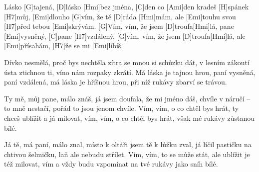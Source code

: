 
\sloka
[Emi]Lásko [G]tajená, [D]lásko [Hmi]bez jména,
[C]den co [Ami]den kradeš [H]spánek [H7]můj,
[Emi]dlouho [G]vím, že tě [D]ráda [Hmi]mám,
ale [Emi]touhu svou [H7]před tebou [Emi]skrývám.
[G]Vím, vím, že jsem [D]troufa[Hmi]lá,
pane [Emi]vysněný, [C]pane [H7]vzdálený,
[G]vím, vím, že jsem [D]troufa[Hmi]lá,
ale [Emi]přísahám, [H7]že se mi [Emi]líbíš.

\sloka
Dívko nesmělá, proč bys nechtěla
zítra se mnou si schůzku dát,
v lesním zákoutí ústa ztichnou ti,
víno nám rozpaky zkrátí.
Má láska je tajnou hrou,
paní vysněná, paní vzdálená,
má láska je hříšnou hrou,
při níž rukávy zbarví se trávou.

\sloka
Ty mě, můj pane, málo znáš,
já jsem doufala, že mi jméno dáš,
chvíle v náručí – to mně nestačí,
pořád to jsou jenom chvíle.
Vím, vím, o co chtěl bys hrát,
ty chceš ublížit a já milovat,
vím, vím, o co chtěl bys hrát,
však mé rukávy zůstanou bílé.

\sloka
Já tě, má paní, málo znal,
místo k oltáři jsem tě k lůžku zval,
já líčil pastičku na chtivou šelmičku,
laň ale nebudu střílet.
Vím, vím, to se může stát,
ale ublížit je též milovat,
vím a vždy budu vzpomínat
na tvé rukávy jako sníh bílé.
